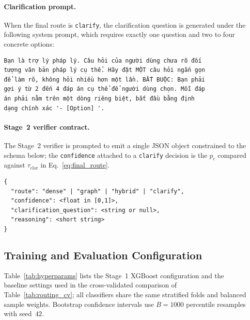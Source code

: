 \paragraph{Clarification prompt.}
When the final route is \texttt{clarify}, the clarification question is
generated under the following system prompt, which requires exactly one
question and two to four concrete options:

\begin{verbatim}
Bạn là trợ lý pháp lý. Câu hỏi của người dùng chưa rõ đối
tượng văn bản pháp lý cụ thể. Hãy đặt MỘT câu hỏi ngắn gọn
để làm rõ, không hỏi nhiều hơn một lần. BẮT BUỘC: Bạn phải
gợi ý từ 2 đến 4 đáp án cụ thể để người dùng chọn. Mỗi đáp
án phải nằm trên một dòng riêng biệt, bắt đầu bằng định
dạng chính xác '- [Option] '.
\end{verbatim}

\paragraph{Stage~2 verifier contract.}
The Stage~2 verifier is prompted to emit a single JSON object constrained to
the schema below; the \texttt{confidence} attached to a \texttt{clarify}
decision is the $p_c$ compared against $\tau_{\mathrm{clar}}$ in
Eq.~\eqref{eq:final_route}.

\begin{verbatim}
{
  "route": "dense" | "graph" | "hybrid" | "clarify",
  "confidence": <float in [0,1]>,
  "clarification_question": <string or null>,
  "reasoning": <short string>
}
\end{verbatim}

\subsection{Training and Evaluation Configuration}\label{app:hyperparams}

Table~\ref{tab:hyperparams} lists the Stage~1 XGBoost configuration and the
baseline settings used in the cross-validated comparison of
Table~\ref{tab:routing_cv}; all classifiers share the same stratified folds
and balanced sample weights. Bootstrap confidence intervals use $B=1000$
percentile resamples with seed~$42$.

